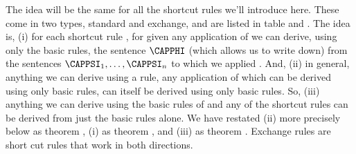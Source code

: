 The idea will be the same for all the shortcut rules we'll introduce here. These come in two types, standard and exchange, and are listed in table  and . The idea is, (i) for each shortcut rule , for given any application of  we can derive, using only the basic rules, the sentence $\CAPPHI$ (which  allows us to write down) from the sentences $\CAPPSI_1,\ldots,\CAPPSI_{\integer{n}}$ to which we applied . 
And, (ii) in general, anything we can derive using a rule, any application of which can be derived using only basic rules, can itself be derived using only basic rules.  
So, (iii) anything we can derive using the basic rules of \GSD{} and any of the shortcut rules can be derived from just the basic rules alone.
We have restated (ii) more precisely below as theorem , (i) as theorem , and (iii) as theorem . 
Exchange rules are short cut rules that work in both directions.


